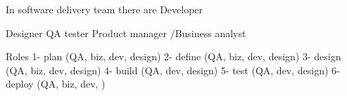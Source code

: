 In software delivery team there are 
  Developer 
    
  Designer 
  QA tester 
  Product manager /Business analyst 

Roles 
  1- plan     (QA, biz, dev, design)
  2- define   (QA, biz, dev, design)
  3- design   (QA, biz, dev, design)
  4- build    (QA, dev, design)
  5- test     (QA, dev, design)
  6- deploy   (QA, biz, dev, )